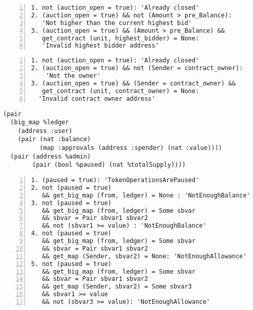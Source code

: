 \begin{lstlisting}[float=tp,captionpos=b,caption={Fail condition for auction contract bid entrypoint},label={lst:fail-condition-auction-contract-bid},numbers=left]
1. not (auction_open = true): 'Already closed'
2. (auction_open = true) && not (Amount > pre_Balance):
   'Not higher than the current highest bid'
3. (auction_open = true) && (Amount > pre_Balance) && 
   get_contract (unit, highest_bidder) = None:
   'Invalid highest bidder address' 
\end{lstlisting}

\begin{lstlisting}[float=tp,captionpos=b,caption={Fail condition for auction contract close entrypoint},label={lst:fail-condition-auction-contract-close},numbers=left]
1. not (auction_open = true): 'Already closed'
2. (auction_open = true) && not (Sender = contract_owner): 
    'Not the owner'
3. (auction_open = true) && (Sender = contract_owner) &&
   get_contract (unit, contract_owner) = None:
  'Invalid contract owner address'
\end{lstlisting}
\begin{lstlisting}[float=tp,captionpos=b,caption={Storage of the USDtz smart contract},label={lst:storage-udstz-contract}]
(pair
  (big_map %ledger
    (address :user)
    (pair (nat :balance)
          (map :approvals (address :spender) (nat :value))))
  (pair (address %admin)
        (pair (bool %paused) (nat %totalSupply))))
\end{lstlisting}
\begin{lstlisting}[float,captionpos=b,caption={Fail conditions for the \lstinline/transfer/ entrypoint},label={lst:transfer-udstz-contract},numbers=left]
1. (paused = true): 'TokenOperationsArePaused'
2. not (paused = true) 
   && get_big_map (from, ledger) = None : 'NotEnoughBalance'
3. not (paused = true) 
   && get_big_map (from, ledger) = Some sbvar 
   && sbvar = Pair sbvar1 sbvar2 
   && not (sbvar1 >= value) : 'NotEnoughBalance'
4. not (paused = true) 
   && get_big_map (from, ledger) = Some sbvar 
   && sbvar = Pair sbvar1 sbvar2 
   && get_map (Sender, sbvar2) = None: 'NotEnoughAllowance'
5. not (paused = true) 
   && get_big_map (from, ledger) = Some sbvar 
   && sbvar = Pair sbvar1 sbvar2 
   && get_map (Sender, sbvar2) = Some sbvar3 
   && sbvar1 >= value 
   && not (sbvar3 >= value): 'NotEnoughAllowance'
\end{lstlisting}

